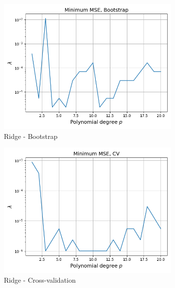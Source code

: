 \documentclass[a4paper]{article}
\begin{document}
\begin{figure}[H]
  \centering
  \begin{subfigure}{0.49\textwidth}
    \includegraphics[scale=0.45]{../figures/task_d/degree_lambda_N529_pmax20_nlamb20_noise0.05_seed4155_Ridge_boot_Nbs264.png}
    \caption{Ridge - Bootstrap}
  \end{subfigure}
  \begin{subfigure}{0.49\textwidth}
    \includegraphics[scale=0.45]{../figures/task_d/degree_lambda_N529_pmax20_nlamb20_noise0.05_seed4155_Ridge_cv_k5.png}
    \caption{Ridge - Cross-validation}
  \end{subfigure}\\
  \begin{subfigure}{0.49\textwidth}

\end{subfigure}
\end{figure}
\end{document}

